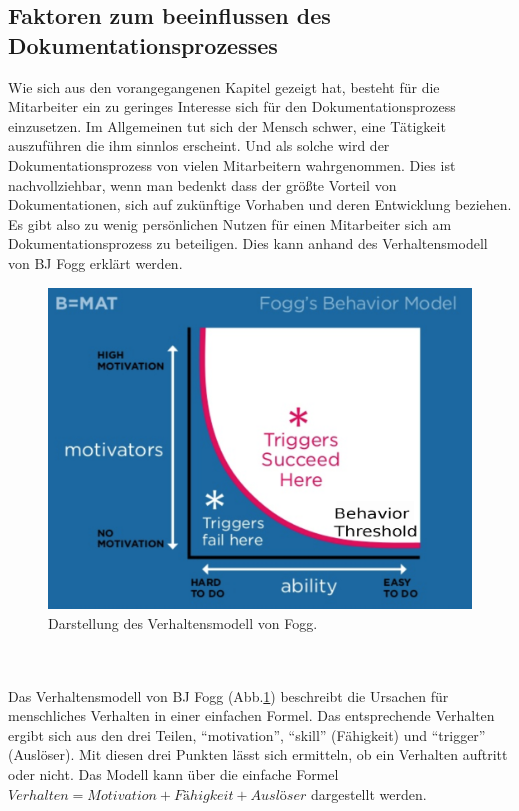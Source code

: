 \documentclass[a4paper,12pt]{scrartcl}
\begin{document}
\subsection{Faktoren zum beeinflussen des Dokumentationsprozesses}
Wie sich aus den vorangegangenen Kapitel gezeigt hat, besteht für die Mitarbeiter ein zu geringes Interesse sich für den Dokumentationsprozess einzusetzen. Im Allgemeinen tut sich der Mensch schwer, eine Tätigkeit auszuführen die ihm sinnlos erscheint. Und als solche wird der Dokumentationsprozess von vielen Mitarbeitern wahrgenommen. Dies ist nachvollziehbar, wenn man bedenkt dass der größte Vorteil von Dokumentationen, sich auf zukünftige Vorhaben und deren Entwicklung beziehen. Es gibt also zu wenig persönlichen Nutzen für einen Mitarbeiter sich am Dokumentationsprozess zu beteiligen. Dies kann anhand des Verhaltensmodell von BJ Fogg erklärt werden.
\begin{figure}[h!]
\begin{center}
\includegraphics[scale = 0.6]{Bilder/Verhaltensmodell.eps}
\caption{Darstellung des Verhaltensmodell von Fogg\cite{Verhaltensmodell2018}.}
\label{VerhaltensmodellBild}
\end{center}
\end{figure}
\\\\
Das Verhaltensmodell von BJ Fogg (Abb.\ref{VerhaltensmodellBild}) beschreibt die Ursachen für menschliches Verhalten in einer einfachen Formel. Das entsprechende Verhalten ergibt sich aus den drei Teilen, \enquote{motivation}, \enquote{skill} (Fähigkeit) und \enquote{trigger} (Auslöser). Mit diesen drei Punkten lässt sich ermitteln, ob ein Verhalten auftritt oder nicht. Das Modell kann über die einfache Formel \( Verhalten = Motivation + Fähigkeit + Auslöser \) dargestellt werden.
\end{document}
